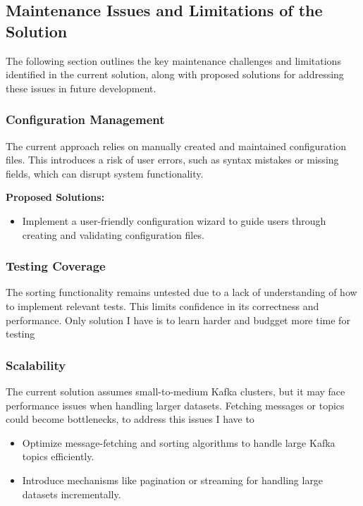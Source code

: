 \documentclass[10pt , a4paper]{report}
\begin{document}
\newpage
\subsection{Maintenance Issues and Limitations of the Solution}

The following section outlines the key maintenance challenges and limitations identified in the current solution, along with proposed solutions for addressing these issues in future development.

\subsubsection{Configuration Management}
The current approach relies on manually created and maintained configuration files. This introduces a risk of user errors, such as syntax mistakes or missing fields, which can disrupt system functionality.

\textbf{Proposed Solutions:}
\begin{itemize}
    \item Implement a user-friendly configuration wizard to guide users through creating and validating configuration files.
\end{itemize}

\subsubsection{Testing Coverage}
The sorting functionality remains untested due to a lack of understanding of how to implement relevant tests. This limits confidence in its correctness and performance. Only solution I have is to learn harder and budgget more time for testing

\subsubsection{Scalability}
The current solution assumes small-to-medium Kafka clusters, but it may face performance issues when handling larger datasets. Fetching messages or topics could become bottlenecks, to address this issues I have to 

\begin{itemize}
    \item Optimize message-fetching and sorting algorithms to handle large Kafka topics efficiently.
    \item Introduce mechanisms like pagination or streaming for handling large datasets incrementally.
\end{itemize}
\end{document}
